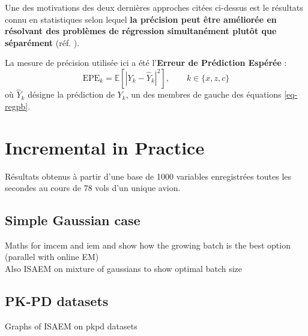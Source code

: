 \documentclass[a0,portrait]{a0poster}
\newcommand{\E}[1]{\mathbb{E}[#1]}
\begin{document}
\begin{multicols}{2}
Une des motivations des deux dernières approches citées ci-dessus est le résultats connu en statistiques selon lequel \textbf{la précision peut être améliorée en résolvant des problèmes de régression simultanément plutôt que séparément} (réf. \cite{stein61}).

La mesure de précision utilisée ici a été l'\textbf{Erreur de Prédiction Espérée} :
\begin{equation}
\mbox{EPE}_k = \E{|Y_k - \hat{Y}_k|^2}, \qquad k\in \{x,z,c\}
\end{equation}
où $\hat{Y}_k$ désigne la prédiction de $Y_k$, un des membres de gauche des équations \eqref{eq-regpb}.

\section{Incremental in Practice}

Résultats obtenus à partir d'une base de 1000 variables enregistrées toutes les secondes au cours de 78 vols d'un unique avion.

\subsection{Simple Gaussian case}
Maths for imcem and iem and show how the growing batch is the best option (parallel with online EM)\\
Also ISAEM on mixture of gaussians to show optimal batch size

\subsection{PK-PD datasets}
Graphs of ISAEM on pkpd datasets




\end{multicols}
\end{document}
